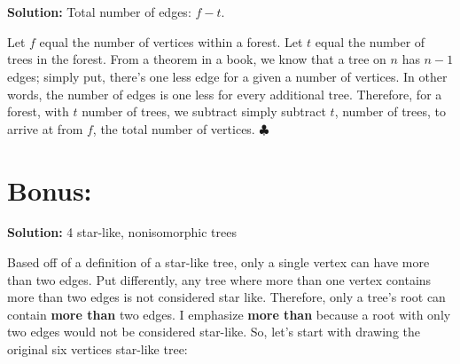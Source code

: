 \documentclass{article}
\begin{document}
\section{}
\textbf{Solution:} Total number of edges: $f - t$.

Let $f$ equal the number of vertices within a forest. Let $t$ equal the number of trees in the forest. From a theorem in a book, we know that a tree on $n$ has $n-1$ edges; simply put, there's one less edge for a given a number of vertices. In other words, the number of edges is one less for every additional tree.  Therefore, for a forest, with $t$ number of trees, we subtract simply subtract $t$, number of trees, to arrive at from $f$, the total number of vertices. $\clubsuit$

\newpage

\section{Bonus: }

\textbf{Solution: } 4 star-like, nonisomorphic trees

Based off of a definition of a star-like tree, only a single vertex can have more than two edges. Put differently, any tree where more than one vertex contains more than two edges is not considered star like. Therefore, only a tree's root can contain \textbf{more than} two edges. I emphasize \textbf{more than} because a root with only two edges would not be considered star-like. So, let's start with drawing the original six vertices star-like tree:

\begin{center}
\end{center}
\end{document}
